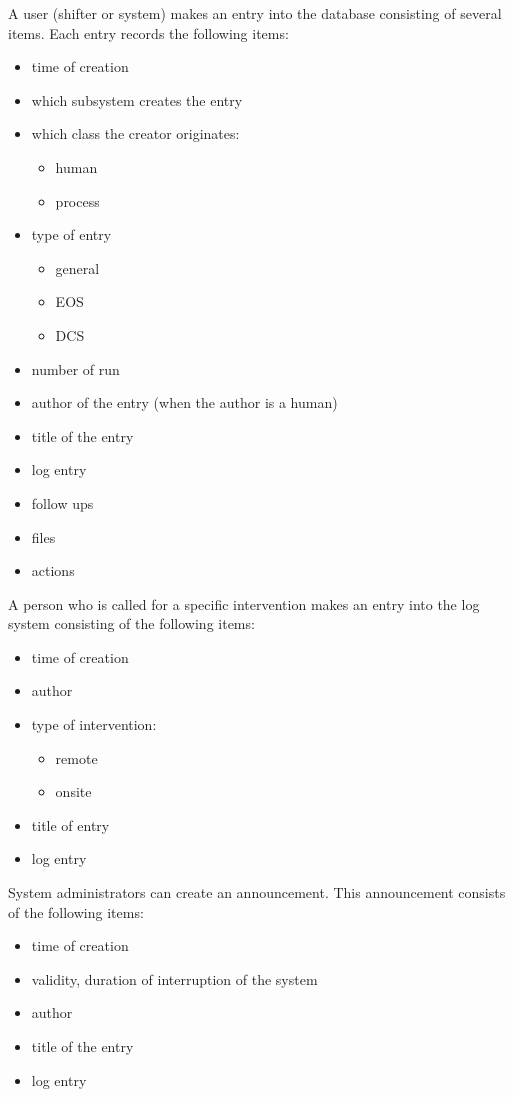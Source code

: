 A user (shifter or system) makes an entry into the database consisting of several items. Each entry records the following items:
\begin{itemize}
  \item time of creation
  \item which subsystem creates the entry
  \item which class the creator originates:
  \begin{itemize}
    \item human
    \item process
  \end{itemize}
  \item type of entry
  \begin{itemize}
    \item general
    \item EOS
    \item DCS
  \end{itemize}
  \item number of run
  \item author of the entry (when the author is a human)
  \item title of the entry
  \item log entry
  \item follow ups
  \item files
  \item actions
\end{itemize}

A person who is called for a specific intervention makes an entry into the log system consisting of the following items:
\begin{itemize}
  \item time of creation
  \item author
  \item type of intervention:
  \begin{itemize}
    \item remote
    \item onsite
  \end{itemize}
  \item title of entry
  \item log entry
\end{itemize}

System administrators can create an announcement. This announcement consists of the following items:
\begin{itemize}
  \item time of creation
  \item validity, duration of interruption of the system
  \item author
  \item title of the entry
  \item log entry
\end{itemize}

